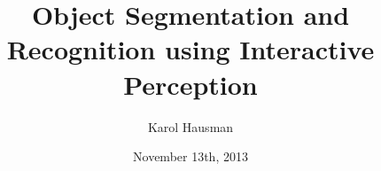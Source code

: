 \newcommand{\thedoctype}{Master's Thesis in Informatik\xspace}
\newcommand{\thetitle}{Object Segmentation and Recognition using Interactive Perception\xspace}
\newcommand{\thetitleGer}{Objektsegmentierung und -erkennung mittels interaktiver Wahrnehmung\xspace}
\newcommand{\theauthor}{Karol Hausman\xspace}
\newcommand{\theplace}{Los Angeles\xspace}
\newcommand{\thedate}{November 13th, 2013\xspace}
\newcommand{\thesupervisor}{Dejan Pangercic}
\newcommand{\thesecsupervisor}{, Dr. J{\"u}rgen Sturm}
\newcommand{\theadvisor}{Prof. Dr. Daniel Cremers}

\date{\thedate}
\title{\thetitle}
\author{\theauthor}

\newcommand{\footertext}{}
